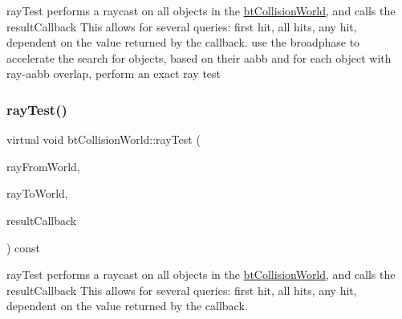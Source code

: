 ray\+Test performs a raycast on all objects in the \hyperlink{classbtCollisionWorld}{bt\+Collision\+World}, and calls the result\+Callback This allows for several queries\+: first hit, all hits, any hit, dependent on the value returned by the callback. use the broadphase to accelerate the search for objects, based on their aabb and for each object with ray-\/aabb overlap, perform an exact ray test \mbox{\label{classbtCollisionWorld_aad7854427ebb72ec77d32a6a2d458504}} 
\subsubsection{\texorpdfstring{ray\+Test()}{rayTest()}\hspace{0.1cm}{\footnotesize\ttfamily [2/2]}}
{\footnotesize\ttfamily virtual void bt\+Collision\+World\+::ray\+Test (\begin{DoxyParamCaption}\item[{const bt\+Vector3 \&}]{ray\+From\+World,  }\item[{const bt\+Vector3 \&}]{ray\+To\+World,  }\item[{\hyperlink{structbtCollisionWorld_1_1RayResultCallback}{Ray\+Result\+Callback} \&}]{result\+Callback }\end{DoxyParamCaption}) const\hspace{0.3cm}{\ttfamily [virtual]}}

ray\+Test performs a raycast on all objects in the \hyperlink{classbtCollisionWorld}{bt\+Collision\+World}, and calls the result\+Callback This allows for several queries\+: first hit, all hits, any hit, dependent on the value returned by the callback. \mbox{\label{classbtCollisionWorld_aca2a9413508b4a2449fe83ff93ea564e}} 
